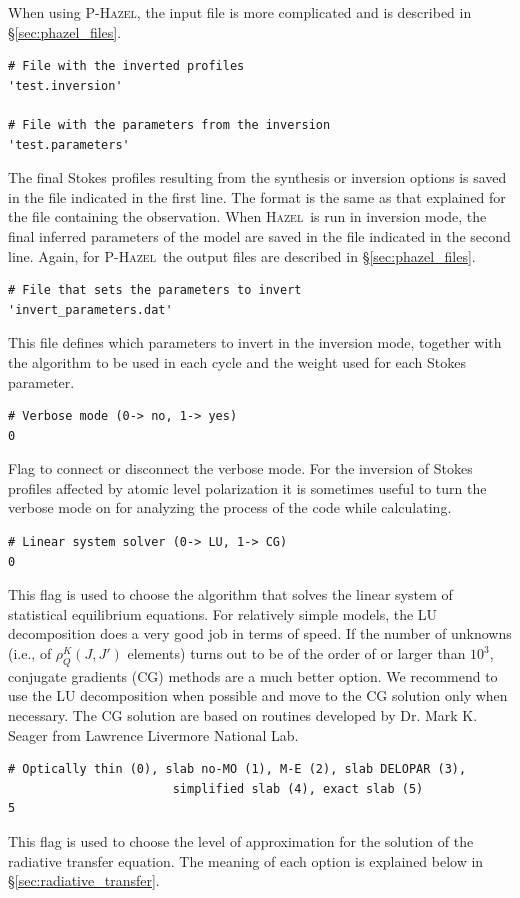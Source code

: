 \documentclass[12pt]{article}
\def\H{\textsc{Hazel}}
\def\HM{\textsc{P-Hazel}}
\begin{document}
When using \HM, the input file is more complicated and is described in \S\ref{sec:phazel_files}.

\begin{verbatim}
# File with the inverted profiles
'test.inversion'

# File with the parameters from the inversion
'test.parameters'
\end{verbatim}
The final Stokes profiles resulting from the synthesis or inversion options is saved in
the file indicated in the first line. The format is the same as that explained for the 
file containing the observation. When \H\ is run in inversion mode, the final inferred
parameters of the model are saved in the file indicated in the second line.
Again, for \HM\ the output files are described in \S\ref{sec:phazel_files}.

\begin{verbatim}
# File that sets the parameters to invert
'invert_parameters.dat'
\end{verbatim}
This file defines which parameters to invert in the inversion mode, together with the
algorithm to be used in each cycle and the weight used for each Stokes parameter.

\begin{verbatim}
# Verbose mode (0-> no, 1-> yes)
0
\end{verbatim}
Flag to connect or disconnect the verbose mode. For the inversion of Stokes profiles
affected by atomic level polarization it is sometimes useful to turn
the verbose mode on for analyzing the process of the code while calculating.

\begin{verbatim}
# Linear system solver (0-> LU, 1-> CG)
0
\end{verbatim}
This flag is used to choose the algorithm that solves the linear system of statistical equilibrium
equations. For relatively simple models, the LU decomposition does a very good job in terms
of speed. If the number of unknowns (i.e., of $\rho^K_Q(J,J')$ elements) turns out to be of the order of or larger than
$10^3$, conjugate gradients (CG) methods are a much better option. We recommend to use the LU 
decomposition when possible and move to the CG solution only when necessary. The CG solution
are based on routines developed by Dr. Mark K. Seager from Lawrence Livermore National Lab.

\begin{verbatim}
# Optically thin (0), slab no-MO (1), M-E (2), slab DELOPAR (3), 
                       simplified slab (4), exact slab (5)
5
\end{verbatim}
This flag is used to choose the level of approximation for the solution of the radiative transfer
equation. The meaning of each option is explained below in \S\ref{sec:radiative_transfer}.
\end{document}
